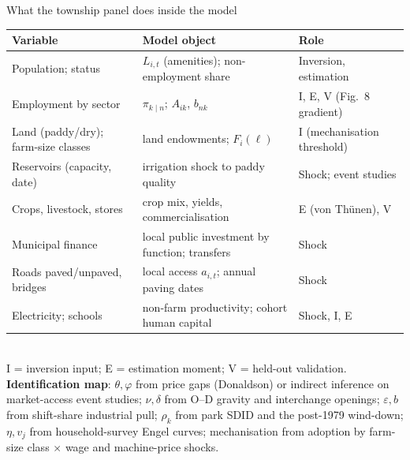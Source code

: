 \documentclass[10pt,aspectratio=169]{beamer}
\newcommand{\hl}[1]{\textcolor{mOrange}{#1}}
\begin{document}
\begin{frame}{What the township panel does inside the model}
  \footnotesize
  \scriptsize
  \begin{tabular}{@{}L{0.24\textwidth}L{0.46\textwidth}L{0.24\textwidth}@{}}
    \toprule
    Variable & Model object & Role \\
    \midrule
    Population; status & $L_{i,t}$ (amenities); non-employment share & Inversion, estimation \\
    Employment by sector & $\pi_{k\mid n}$; $A_{ik}$, $b_{nk}$ & I, E, V (Fig.\ 8 gradient) \\
    Land (paddy/dry); farm-size classes & land endowments; $F_i(\ell)$ & I (mechanisation threshold) \\
    Reservoirs (capacity, date) & irrigation shock to paddy quality & \hl{Shock}; event studies \\
    Crops, livestock, stores & crop mix, yields, commercialisation & E (von Th\"unen), V \\
    Municipal finance & local public investment by function; transfers & Shock \\
    Roads paved/unpaved, bridges & local access $a_{i,t}$; annual paving dates & \hl{Shock} \\
    Electricity; schools & non-farm productivity; cohort human capital & Shock, I, E \\
    \bottomrule
  \end{tabular}\\[0.3em]
  \tiny I = inversion input; E = estimation moment; V = held-out validation.\\[0.4em]
  \small
  \textbf{Identification map}: $\theta,\varphi$ from price gaps (Donaldson) or indirect
  inference on market-access event studies; $\nu,\delta$ from O--D gravity and interchange
  openings; $\varepsilon,b$ from shift-share industrial pull; $\rho_k$ from park SDID and
  the post-1979 wind-down; $\eta,v_j$ from household-survey Engel curves; mechanisation
  from adoption by farm-size class $\times$ wage and machine-price shocks.
\end{frame}
\end{document}
